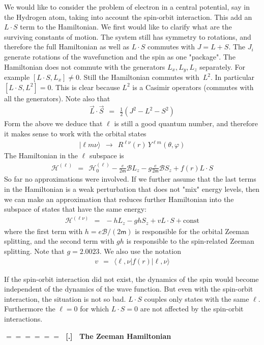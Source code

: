 \documentclass[onecolumn,fleqn]{revtex4}
\newcommand{\mass}{\mathsf{m}}
\newcommand{\beq}{\begin{eqnarray}}
\newcommand{\eeq}{\end{eqnarray}}
\renewcommand{\thesubsection}{\arabic{subsection}}
\renewcommand{\thesubsubsection}{\arabic{subsubsection}}
\newcommand{\sheadC}[1]
{
\addtocounter{subsubsection}{1}
\vspace{5mm}
{\Large\bf $=\!=\!=\!=\!=\!=\;$ [\thesubsection.\thesubsubsection] \ #1}  
\nopagebreak
\phantomsection
}
\begin{document}
We would like to consider the problem of electron in a central potential, 
say in the Hydrogen atom, taking into account the spin-orbit interaction.
This add an $L\cdot S$ term to the Hamiltonian. 
We first would like to clarify what are the surviving constants of motion.
The system still has symmetry to rotations, 
and therefore the full Hamiltonian as well as $L\cdot S$ 
commutes with ${J=L+S}$. The $J_i$ generate rotations 
of the wavefunction and the spin as one "package".  
The Hamiltonian does not commute with the generators 
${L_x,L_y,L_z}$ separately. For example ${[L \cdot S,L_x] \neq 0}$.
Still the Hamiltonian commutes with~$L^2$. 
In particular ${[L \cdot S,L^2]=0}$. This is clear 
because $L^2$ is a Casimir operators (commutes with all the generators).    
Note also that  
\beq
\vec{L} \cdot \vec{S} \ \ = \ \ \frac{1}{2} \left (J^2 - L^2 - S^2 \right ) 
\eeq
Form the above we deduce that $\ell$ is still a good quantum number, 
and therefore it makes sense to work with the orbital states  
\beq
|\ell m \nu \rangle \ \ \rightarrow \ \ R^{\ell\nu}(r) \, Y^{\ell m}(\theta,\varphi) 
\eeq
The Hamiltonian in the $\ell$ subspace is 
\beq
\mathcal{H}^{(\ell)} 
\ \ = \ \ \mathcal{H}_0^{(\ell)} 
- \frac{e}{2\mass} \mathcal{B} L_z 
- g\frac{e}{2\mass}\mathcal{B} S_z 
+ f(r) L\cdot S 
\eeq
So far no approximations were involved. 
If we further assume that the last terms in the Hamiltonian 
is a weak perturbation that does not "mix" energy levels, 
then we can make an approximation that reduces further Hamiltonian 
into the subspace of states that have the same energy:
\beq
\mathcal{H}^{(\ell\nu)} \ \ = \ \ -h L_z - g h S_z + v L \cdot S +\mbox{const} 
\eeq
where the first term with ${h=e\mathcal{B}/(2\mass)}$ 
is responsible for the orbital Zeeman splitting,  
and the second term with ${gh}$ is responsible 
to the spin-related Zeeman splitting. 
Note that $g=2.0023$. We also use the notation  
\beq
v \ \ = \ \ \langle \ell, \nu | f(r) | \ell, \nu \rangle 
\eeq


If the spin-orbit interaction did not exist, the dynamics 
of the spin would become independent of the dynamics 
of the wave function. But even with the spin-orbit 
interaction, the situation is not so bad. ${L \cdot S}$ couples 
only states with the same ${\ell}$. 
Furthermore the ${\ell=0}$ for which ${L \cdot S=0}$
are not affected by the spin-orbit interactions. 


\sheadC{The Zeeman Hamiltonian}
\end{document}
